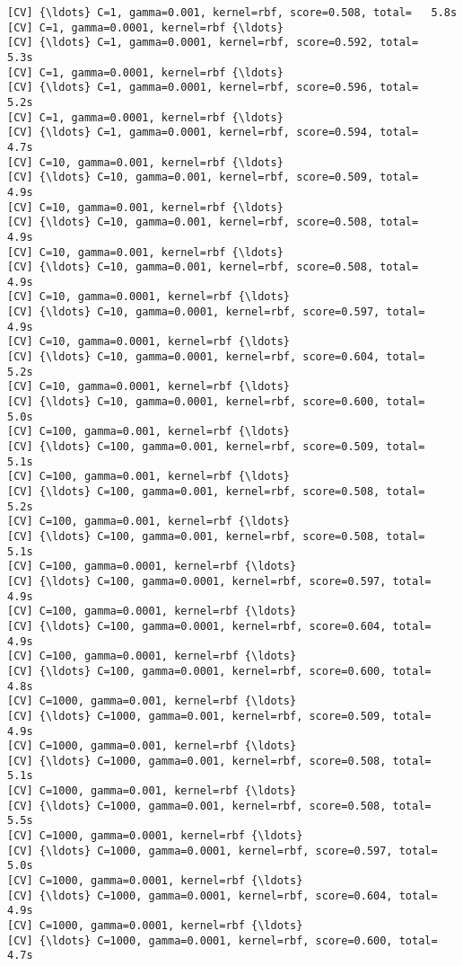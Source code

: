 \documentclass[11pt]{article}
\begin{document}
    \begin{Verbatim}[commandchars=\\\{\}]
[CV] {\ldots} C=1, gamma=0.001, kernel=rbf, score=0.508, total=   5.8s
[CV] C=1, gamma=0.0001, kernel=rbf {\ldots}
[CV] {\ldots} C=1, gamma=0.0001, kernel=rbf, score=0.592, total=   5.3s
[CV] C=1, gamma=0.0001, kernel=rbf {\ldots}
[CV] {\ldots} C=1, gamma=0.0001, kernel=rbf, score=0.596, total=   5.2s
[CV] C=1, gamma=0.0001, kernel=rbf {\ldots}
[CV] {\ldots} C=1, gamma=0.0001, kernel=rbf, score=0.594, total=   4.7s
[CV] C=10, gamma=0.001, kernel=rbf {\ldots}
[CV] {\ldots} C=10, gamma=0.001, kernel=rbf, score=0.509, total=   4.9s
[CV] C=10, gamma=0.001, kernel=rbf {\ldots}
[CV] {\ldots} C=10, gamma=0.001, kernel=rbf, score=0.508, total=   4.9s
[CV] C=10, gamma=0.001, kernel=rbf {\ldots}
[CV] {\ldots} C=10, gamma=0.001, kernel=rbf, score=0.508, total=   4.9s
[CV] C=10, gamma=0.0001, kernel=rbf {\ldots}
[CV] {\ldots} C=10, gamma=0.0001, kernel=rbf, score=0.597, total=   4.9s
[CV] C=10, gamma=0.0001, kernel=rbf {\ldots}
[CV] {\ldots} C=10, gamma=0.0001, kernel=rbf, score=0.604, total=   5.2s
[CV] C=10, gamma=0.0001, kernel=rbf {\ldots}
[CV] {\ldots} C=10, gamma=0.0001, kernel=rbf, score=0.600, total=   5.0s
[CV] C=100, gamma=0.001, kernel=rbf {\ldots}
[CV] {\ldots} C=100, gamma=0.001, kernel=rbf, score=0.509, total=   5.1s
[CV] C=100, gamma=0.001, kernel=rbf {\ldots}
[CV] {\ldots} C=100, gamma=0.001, kernel=rbf, score=0.508, total=   5.2s
[CV] C=100, gamma=0.001, kernel=rbf {\ldots}
[CV] {\ldots} C=100, gamma=0.001, kernel=rbf, score=0.508, total=   5.1s
[CV] C=100, gamma=0.0001, kernel=rbf {\ldots}
[CV] {\ldots} C=100, gamma=0.0001, kernel=rbf, score=0.597, total=   4.9s
[CV] C=100, gamma=0.0001, kernel=rbf {\ldots}
[CV] {\ldots} C=100, gamma=0.0001, kernel=rbf, score=0.604, total=   4.9s
[CV] C=100, gamma=0.0001, kernel=rbf {\ldots}
[CV] {\ldots} C=100, gamma=0.0001, kernel=rbf, score=0.600, total=   4.8s
[CV] C=1000, gamma=0.001, kernel=rbf {\ldots}
[CV] {\ldots} C=1000, gamma=0.001, kernel=rbf, score=0.509, total=   4.9s
[CV] C=1000, gamma=0.001, kernel=rbf {\ldots}
[CV] {\ldots} C=1000, gamma=0.001, kernel=rbf, score=0.508, total=   5.1s
[CV] C=1000, gamma=0.001, kernel=rbf {\ldots}
[CV] {\ldots} C=1000, gamma=0.001, kernel=rbf, score=0.508, total=   5.5s
[CV] C=1000, gamma=0.0001, kernel=rbf {\ldots}
[CV] {\ldots} C=1000, gamma=0.0001, kernel=rbf, score=0.597, total=   5.0s
[CV] C=1000, gamma=0.0001, kernel=rbf {\ldots}
[CV] {\ldots} C=1000, gamma=0.0001, kernel=rbf, score=0.604, total=   4.9s
[CV] C=1000, gamma=0.0001, kernel=rbf {\ldots}
[CV] {\ldots} C=1000, gamma=0.0001, kernel=rbf, score=0.600, total=   4.7s
    \end{Verbatim}
\end{document}
